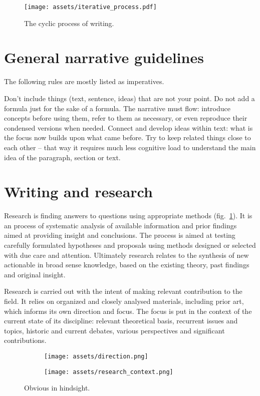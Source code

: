 \documentclass[10pt,a4paper,twocolumn]{article}
\begin{document}
\begin{figure}
  \centering
  \texttt{[image: assets/iterative\_process.pdf]}
  \caption{
    The cyclic process of writing.
  }
\end{figure}


\section{General narrative guidelines} %
\label{sec:general_narrative_guidelines}

The following rules are mostly listed as imperatives.

Don't include things (text, sentence, ideas) that are not your point. Do not add a formula
just for the sake of a formula. The narrative must flow: introduce concepts before using
them, refer to them as necessary, or even reproduce their condensed versions when needed.
Connect and develop ideas within text: what is the focus now builds upon what came before.
Try to keep related things close to each other -- that way it requires much less cognitive
load to understand the main idea of the paragraph, section or text.


\section{Writing and research} %
\label{sec:writing_and_research}

Research is finding answers to questions using appropriate methods (fig.~\ref{fig:direction}).
It is an process of systematic analysis of available information and prior findings
aimed at providing insight and conclusions. The process is aimed at testing carefully
formulated hypotheses and proposals using methods designed or selected with due care
and attention. Ultimately research relates to the synthesis of new actionable in broad
sense knowledge, based on the existing theory, past findings and original insight.

Research is carried out with the intent of making relevant contribution to the field. It
relies on organized and closely analysed materials, including prior art, which informs
its own direction and focus. The focus is put in the context of the current state of its
discipline: relevant theoretical basis, recurrent issues and topics, historic and current
debates, various perspectives and significant contributions.
\begin{figure}
  \centering
  \begin{subfigure}
    \centering
    \texttt{[image: assets/direction.png]}
  \end{subfigure}%
  \begin{subfigure}
    \centering
    \texttt{[image: assets/research\_context.png]}
  \end{subfigure}
  \caption{
    Obvious in hindsight.
  }
  \label{fig:direction}
\end{figure}
\end{document}
